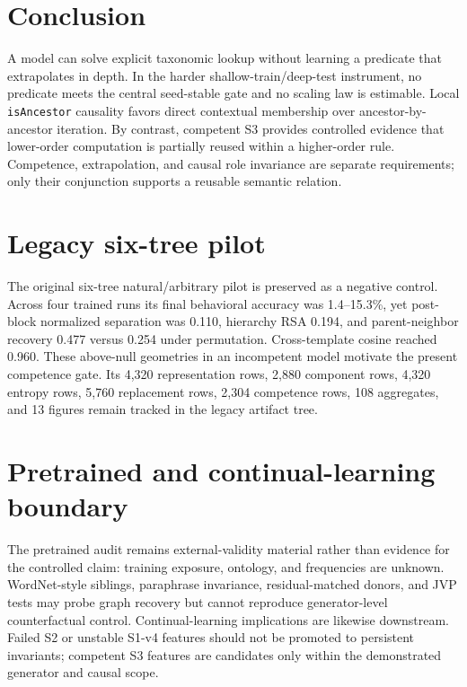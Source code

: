 \documentclass[10pt]{article}
\begin{document}
\section{Conclusion}
A model can solve explicit taxonomic lookup without learning a predicate that extrapolates in depth. In the harder shallow-train/deep-test instrument, no predicate meets the central seed-stable gate and no scaling law is estimable. Local \texttt{isAncestor} causality favors direct contextual membership over ancestor-by-ancestor iteration. By contrast, competent S3 provides controlled evidence that lower-order computation is partially reused within a higher-order rule. Competence, extrapolation, and causal role invariance are separate requirements; only their conjunction supports a reusable semantic relation.

\appendix
\section{Legacy six-tree pilot}
The original six-tree natural/arbitrary pilot is preserved as a negative control. Across four trained runs its final behavioral accuracy was 1.4--15.3\%, yet post-block normalized separation was 0.110, hierarchy RSA 0.194, and parent-neighbor recovery 0.477 versus 0.254 under permutation. Cross-template cosine reached 0.960. These above-null geometries in an incompetent model motivate the present competence gate. Its 4,320 representation rows, 2,880 component rows, 4,320 entropy rows, 5,760 replacement rows, 2,304 competence rows, 108 aggregates, and 13 figures remain tracked in the legacy artifact tree.

\section{Pretrained and continual-learning boundary}
The pretrained audit remains external-validity material rather than evidence for the controlled claim: training exposure, ontology, and frequencies are unknown. WordNet-style siblings, paraphrase invariance, residual-matched donors, and JVP tests may probe graph recovery but cannot reproduce generator-level counterfactual control. Continual-learning implications are likewise downstream. Failed S2 or unstable S1-v4 features should not be promoted to persistent invariants; competent S3 features are candidates only within the demonstrated generator and causal scope.
\end{document}
